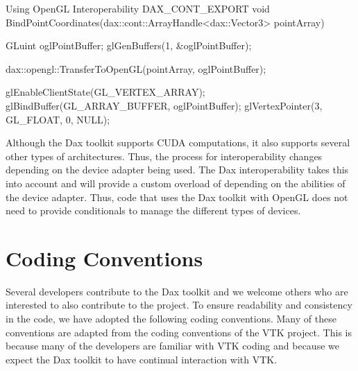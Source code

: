 \begin{daxexample}{Using OpenGL Interoperability}
DAX_CONT_EXPORT
void BindPointCoordinates(dax::cont::ArrayHandle<dax::Vector3> pointArray)
{
  GLuint oglPointBuffer;
  glGenBuffers(1, &oglPointBuffer);

  dax::opengl::TransferToOpenGL(pointArray, oglPointBuffer);

  glEnableClientState(GL_VERTEX_ARRAY);
  glBindBuffer(GL_ARRAY_BUFFER, oglPointBuffer);
  glVertexPointer(3, GL_FLOAT, 0, NULL);
}
\end{daxexample}

Although the Dax toolkit supports CUDA computations, it also supports
several other types of architectures. Thus, the process for
interoperability changes depending on the device adapter being used. The
Dax interoperability takes this into account and will provide a custom
overload of  depending on the abilities of
the device adapter. Thus, code that uses the Dax toolkit with OpenGL does
not need to provide conditionals to manage the different types of devices.



\section{Coding Conventions}
\label{sec:CodingConventions}

Several developers contribute to the Dax toolkit and we welcome others who
are interested to also contribute to the project. To ensure readability and
consistency in the code, we have adopted the following coding
conventions. Many of these conventions are adapted from the coding
conventions of the VTK project. This is because many of the developers are
familiar with VTK coding and because we expect the Dax toolkit to have
continual interaction with VTK.

